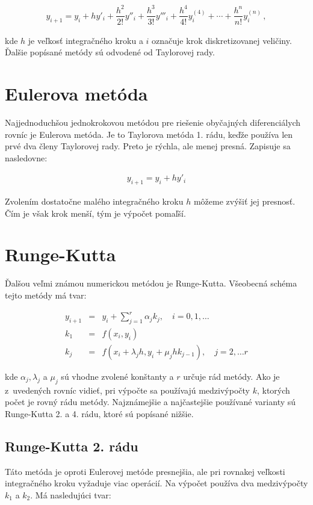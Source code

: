 \begin{eqnarray}
y_{i + 1} = y_{i} + h y'_{i} + \dfrac{h^{2}}{2!}y''_{i} + \dfrac{h^{3}}{3!}y'''_{i} + \dfrac{h^{4}}{4!}y^{(4)}_{i} + \cdots + \dfrac{h^{n}}{n!}y_{i}^{(n)} \, , \label{Taylor}
\end{eqnarray}

kde $ h $ je veľkosť integračného kroku a $ i $ označuje krok diskretizovanej veličiny. Ďalšie popísané metódy sú odvodené od Taylorovej rady.


\section{Eulerova metóda}
Najjednoduchšou jednokrokovou metódou pre riešenie obyčajných diferenciálych rovníc je Eulerova metóda. Je to Taylorova metóda 1. rádu, keďže používa len prvé dva členy Taylorovej rady. Preto je rýchla, ale menej presná. Zapisuje sa nasledovne:

\begin{eqnarray}
y_{i+1} = y_{i} + hy'_{i}
\end{eqnarray}

Zvolením dostatočne malého integračného kroku $ h $ môžeme zvýšiť jej presnosť. Čím je však krok menší, tým je výpočet pomaľší.


\section{Runge-Kutta}
Ďalšou veľmi známou numerickou metódou je Runge-Kutta. Všeobecná schéma tejto metódy má tvar:

\begin{eqnarray}
y_{i+1} & = & y_{i} + \sum^{r}_{j=1} \alpha_{j}k_{j} , \quad i=0, 1,\dotsc \\
k_{1} & = & f(x_{i},y_{i}) \nonumber \\
k_{j} & = & f(x_{i} + \lambda_{j}h, y_{i} + \mu_{j}hk_{j-1}) , \quad j=2,\dotsc r \nonumber
\end{eqnarray}

kde $\alpha_{j}, \lambda_{j}$ a $\mu_{j}$ sú vhodne zvolené konštanty a $ r $ určuje rád metódy. Ako je z~uvedených rovníc vidieť, pri výpočte sa používajú medzivýpočty $ k $, ktorých počet je rovný rádu metódy.
Najznámejšie a najčastejšie používané varianty sú Runge-Kutta 2. a 4. rádu, ktoré sú popísané nižšie.

\subsection{Runge-Kutta 2. rádu} \label{RK2}
Táto metóda je oproti Eulerovej metóde presnejšia, ale pri rovnakej veľkosti integračného kroku vyžaduje viac operácií. Na výpočet používa dva medzivýpočty $ k_{1} $ a $ k_{2} $. Má nasledujúci tvar:

